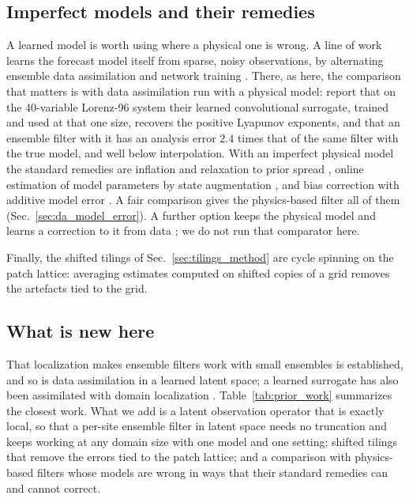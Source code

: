 \subsection{Imperfect models and their remedies}
\label{sec:bg_model_error}

A learned model is worth using where a physical one is wrong. A line of
work learns the forecast model itself from sparse, noisy observations, by
alternating ensemble data assimilation and network training
\citep{brajard2020,bocquet2020}. There, as here, the comparison that
matters is with data assimilation run with a physical model:
\citet{brajard2020} report that on the 40-variable Lorenz-96 system their
learned convolutional surrogate, trained and used at that one size,
recovers the positive Lyapunov exponents, and that an ensemble filter
with it has an analysis error $2.4$ times that of the same filter with the
true model, and well below interpolation. With an imperfect physical model
the standard remedies are inflation and relaxation to prior spread
\citep{whitakerhamill2012}, online estimation of model parameters by state
augmentation \citep{anderson2001,ruiz2013}, and bias correction with
additive model error \citep{dee2005}. A fair comparison gives the
physics-based filter all of them (Sec.~\ref{sec:da_model_error}). A further
option keeps the physical model and learns a correction to it from data
\citep{pathak2018hybrid}; we do not run that comparator here.

Finally, the shifted tilings of Sec.~\ref{sec:tilings_method} are cycle
spinning \citep{coifmandonoho1995} on the patch lattice: averaging
estimates computed on shifted copies of a grid removes the artefacts tied
to the grid.

\subsection{What is new here}
\label{sec:bg_novelty}

That localization makes ensemble filters work with small ensembles is
established, and so is data assimilation in a learned latent space; a
learned surrogate has also been assimilated with domain localization
\citep{penny2022}. Table~\ref{tab:prior_work} summarizes the closest work.
What we add is a latent observation operator that is exactly local, so that a per-site ensemble filter in latent space needs no
truncation and keeps working at any domain size with one model and one
setting; shifted tilings that remove the errors tied to the patch lattice;
and a comparison with physics-based filters whose models are wrong in ways
that their standard remedies can and cannot correct.

